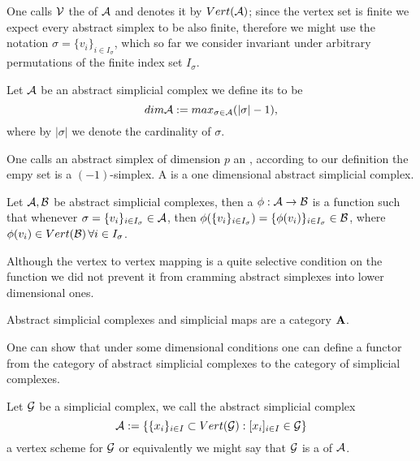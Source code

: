 \documentclass[../1.tex]{subfiles}
\begin{document}
    One calls $\mathcal{V}$ the  of $\mathcal{A}$ and denotes it by $Vert(\mathcal{A})$; since the vertex
    set is finite we expect every abstract simplex to be also finite, therefore we might use the notation $\sigma = \{ v_i \}_{i \in I_\sigma}$,
    which so far we consider invariant under arbitrary permutations of the finite index set $I_\sigma$.

    \begin{defn}
        Let $\mathcal{A}$ be an abstract simplicial complex we define its  to be
        \[ dim \mathcal{A} := max_{\sigma \in \mathcal{A}}(|\sigma|-1), \]
        where by $|\sigma|$ we denote the cardinality of $\sigma$.
    \end{defn}

    One calls an abstract simplex of dimension $p$ an , according to our
    definition the empy set is a $(-1)$-simplex. A  is a one dimensional abstract simplicial complex.

    \begin{defn}
        Let $\mathcal{A},\mathcal{B}$ be abstract simplicial complexes, then a  $\phi : \mathcal{A} \to \mathcal{B}$ is a function 
        such that whenever $\sigma = \{v_i\}_{i \in I_\sigma} \in \mathcal{A}$, then $\phi(\{v_i\}_{i \in I_\sigma}) = \{\phi(v_i)\}_{i \in I_\sigma} \in \mathcal{B}$,
        where $\phi(v_i) \in Vert(\mathcal{B}) \, \forall i \in I_\sigma$.
    \end{defn}

    Although the vertex to vertex mapping is a quite selective condition on the function we did not prevent it from cramming
    abstract simplexes into lower dimensional ones.

    \begin{thm}
        Abstract simplicial complexes and simplicial maps are a category $\textbf{A}$.
    \end{thm}

    One can show that under some dimensional conditions one can define a functor from the category of abstract simplicial complexes
    to the category of simplicial complexes.

    \begin{defn}
        Let $\mathcal{G}$ be a simplicial complex,  we call the abstract simplicial complex 
        \[ \mathcal{A} := \{ \{x_i\}_{i \in I} \subset Vert(\mathcal{G}) : [x_i]_{i \in I} \in \mathcal{G} \} \]
        a vertex scheme for $\mathcal{G}$ or equivalently we might say that $\mathcal{G}$ is a  of $\mathcal{A}$.
    \end{defn}
\end{document}
